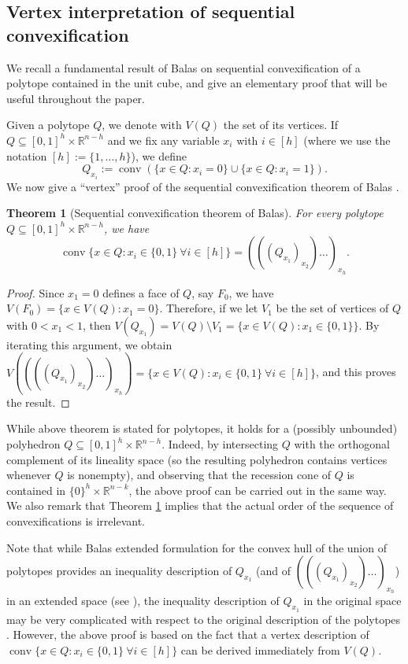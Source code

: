 \documentclass[11pt,a4paper]{article}
\newtheorem{theorem}{Theorem}[section]
\newcommand{\R}{\mathbb{R}}
\newcommand{\conv}{\operatorname{conv}}
\newcommand{\1}{\textbf{1}}
\begin{document}
\subsection{Vertex interpretation of sequential convexification}\label{sec:seq-conv}

We recall a fundamental result of Balas \cite{balas1998disjunctive} on sequential convexification of a polytope contained in the unit cube, and  give an elementary proof  that will be useful throughout the paper.

Given a polytope $Q$, we denote with $V(Q)$ the set of its vertices. 
If $Q\subseteq [0,1]^h\times \R^{n-h}$ and we fix any variable $x_i$ with $i\in [h]$ (where we use the notation $[h]:=\{1,\dots,h\}$), we define 
$$Q_{x_i}:=\conv\left(\{x\in Q:x_i=0\} \cup \{x\in Q:x_i=1\}\right).$$
We now give a ``vertex'' proof of the sequential convexification theorem of Balas \cite{balas1998disjunctive}.
\begin{theorem} [Sequential convexification theorem of Balas] \label{thm:balas}
For every polytope  $Q\subseteq [0,1]^h\times \R^{n-h}$, we have  $$\conv\{x\in Q : x_i\in \{0,1\}\:\forall i\in [h]\}=(((Q_{x_1})_{x_2})\dots )_{x_h}.$$
\end{theorem}

\begin{proof} Since $x_1=0$ defines a face of $Q$, say $F_0$, we have $V(F_0)=\{x\in V(Q):x_1=0\}$. Therefore, if we let $V_1$ be the set of vertices of $Q$ with $0<x_1<1$, then  $V(Q_{x_1})=V(Q)\setminus V_1=\{x\in V(Q):x_1\in \{0,1\}\}$. By iterating this argument, we obtain $V((((Q_{x_1})_{x_2})\dots )_{x_h})=\{x\in V(Q):x_i\in \{0,1\}\:\forall i\in [h]\}$, and this proves the result.
\end{proof}

While above theorem is stated for polytopes,  it holds for a (possibly unbounded) polyhedron $Q\subseteq [0,1]^h\times \R^{n-h}$. Indeed, by intersecting $Q$ with the orthogonal complement of its lineality space (so the resulting polyhedron  contains vertices whenever $Q$ is nonempty), and observing  that the recession cone of $Q$ is contained in $\{0\}^h\times \R^{n-k}$, the above proof can be carried out in the same way. We also remark that Theorem \ref{thm:balas} implies that the actual order of the sequence of convexifications is irrelevant.
\medskip


Note that while Balas extended formulation for the convex hull of the union of polytopes provides an inequality description of $Q_{x_1}$ (and of $(((Q_{x_1})_{x_2})\dots )_{x_h}$) in an extended space (see \cite[Section 4.9]{conforti2014integer}), the inequality description of $Q_{x_1}$ in the original space may be very complicated with respect to the original description of the polytopes  \cite{conforti2020balas}. However, the above proof is based on the fact  that a vertex description of $\conv\{x\in Q : x_i\in \{0,1\}\:\forall i\in [h]\}$ can be derived immediately from $V(Q)$.
\medskip
\end{document}
